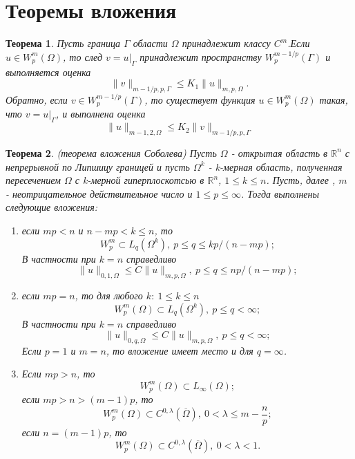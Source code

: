 \documentclass[9pt]{article}
\newtheorem{theorem}{Теорема} %
\begin{document}
	\section{Теоремы вложения}
	\begin{theorem}
		Пусть граница $\Gamma$ области $\Omega$ принадлежит классу $C^m$.Если $u \in W_p^m(\Omega)$, то след $v = u\vert_\Gamma$ принадлежит пространству $W^{m-1/p}_p(\Gamma)$ и выполняется оценка
		\begin{equation*}
			\|v\|_{m-1/p, p, \Gamma} \leq K_1 \|u\|_{m,p,\Omega}.
		\end{equation*}
		Обратно, если $v \in W^{m- 1/p}_p(\Gamma)$, то существует функция $u \in W_p^m(\Omega)$ такая, что $v = u\vert_\Gamma$, и выполнена оценка
		\begin{equation*}
			\|u\|_{m-1, 2, \Omega} \leq K_2 \|v\|_{m-1/p, p, \Gamma}
		\end{equation*}
	\end{theorem}
	\begin{theorem}
		(теорема вложения Соболева)\newline
		Пусть $\Omega$ - открытая область в $\mathbb{R}^n$ с непрерывной по Липшицу границей и пусть $\Omega^k$ - k-мерная область, полученная пересечением $\Omega$ с k-мерной гиперплоскотсью в $\mathbb{R}^n$, $1 \leq k \leq n$. Пусть, далее , $m$ - неотрицательное действительное число и $1 \leq p \leq \infty$. Тогда выполнены следующие вложения:
		\begin{enumerate}
			\item если $mp < n$ и $n - mp < k \leq n$, то 
			$$
				W^m_p \subset L_q(\Omega^k), \ p \leq q \leq kp/(n-mp);
			$$
			В частности при $k = n$ справедливо
			$$
			\|u\|_{0,1,\Omega} \leq C \|u\|_{m,p,\Omega}, \ p \leq q \leq np /(n-mp);
			$$
			\item если $mp = n$, то для любого $k: \ 1 \leq k \leq n$
			$$
				W^m_p(\Omega) \subset L_q(\Omega^k), \ p \leq q < \infty;
			$$
			В частности при $k = n$ справедливо
			$$
				\|u\|_{0,q,\Omega} \leq C \|u\|_{m,p,\Omega}, \ p \leq q < \infty;
			$$
			Если $p=1$ и $m=n$, то вложение имеет место и для $q= \infty$.
			\item Если $mp > n$, то 
			$$
				W^m_p(\Omega) \subset L_\infty(\Omega);
			$$
			если $mp > n > (m-1)p$, то 
			$$
				W^m_p(\Omega) \subset C^{0,\lambda}(\overline{\Omega}), \ 0 < \lambda \leq m - \dfrac{n}{p};
			$$
			если $n =(m-1)p$, то
			$$
			W^m_p(\Omega) \subset C^{0,\lambda} (\overline{\Omega}), \ 0 < \lambda < 1.
			$$
		\end{enumerate}
	\end{theorem}
\end{document}

